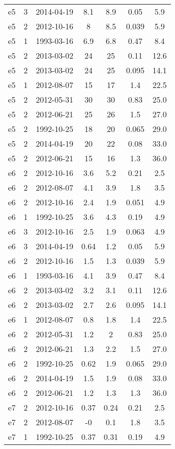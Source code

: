 \begin{table*}[htp]
\begin{tabular}{ccccccc}
e5 & 3 & 2014-04-19 & 8.1 & 8.9 & 0.05 & 5.9 \\
e5 & 2 & 2012-10-16 & 8 & 8.5 & 0.039 & 5.9 \\
e5 & 1 & 1993-03-16 & 6.9 & 6.8 & 0.47 & 8.4 \\
e5 & 2 & 2013-03-02 & 24 & 25 & 0.11 & 12.6 \\
e5 & 2 & 2013-03-02 & 24 & 25 & 0.095 & 14.1 \\
e5 & 1 & 2012-08-07 & 15 & 17 & 1.4 & 22.5 \\
e5 & 2 & 2012-05-31 & 30 & 30 & 0.83 & 25.0 \\
e5 & 2 & 2012-06-21 & 25 & 26 & 1.5 & 27.0 \\
e5 & 2 & 1992-10-25 & 18 & 20 & 0.065 & 29.0 \\
e5 & 2 & 2014-04-19 & 20 & 22 & 0.08 & 33.0 \\
e5 & 2 & 2012-06-21 & 15 & 16 & 1.3 & 36.0 \\
e6 & 2 & 2012-10-16 & 3.6 & 5.2 & 0.21 & 2.5 \\
e6 & 2 & 2012-08-07 & 4.1 & 3.9 & 1.8 & 3.5 \\
e6 & 2 & 2012-10-16 & 2.4 & 1.9 & 0.051 & 4.9 \\
e6 & 1 & 1992-10-25 & 3.6 & 4.3 & 0.19 & 4.9 \\
e6 & 3 & 2012-10-16 & 2.5 & 1.9 & 0.063 & 4.9 \\
e6 & 3 & 2014-04-19 & 0.64 & 1.2 & 0.05 & 5.9 \\
e6 & 2 & 2012-10-16 & 1.5 & 1.3 & 0.039 & 5.9 \\
e6 & 1 & 1993-03-16 & 4.1 & 3.9 & 0.47 & 8.4 \\
e6 & 2 & 2013-03-02 & 3.2 & 3.1 & 0.11 & 12.6 \\
e6 & 2 & 2013-03-02 & 2.7 & 2.6 & 0.095 & 14.1 \\
e6 & 1 & 2012-08-07 & 0.8 & 1.8 & 1.4 & 22.5 \\
e6 & 2 & 2012-05-31 & 1.2 & 2 & 0.83 & 25.0 \\
e6 & 2 & 2012-06-21 & 1.3 & 2.2 & 1.5 & 27.0 \\
e6 & 2 & 1992-10-25 & 0.62 & 1.9 & 0.065 & 29.0 \\
e6 & 2 & 2014-04-19 & 1.5 & 1.9 & 0.08 & 33.0 \\
e6 & 2 & 2012-06-21 & 1.2 & 1.3 & 1.3 & 36.0 \\
e7 & 2 & 2012-10-16 & 0.37 & 0.24 & 0.21 & 2.5 \\
e7 & 2 & 2012-08-07 & -0 & 0.1 & 1.8 & 3.5 \\
e7 & 1 & 1992-10-25 & 0.37 & 0.31 & 0.19 & 4.9 \\

\end{tabular}
\end{table*}
